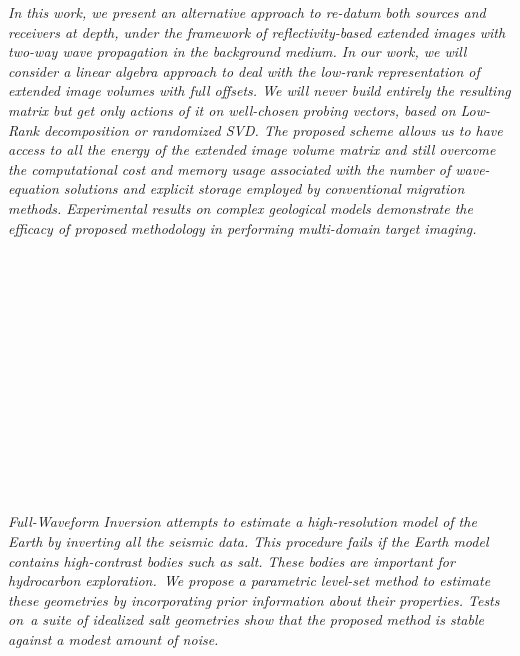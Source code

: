 \begin{multicols}{2}
      \textit{In this work, we present an alternative approach to re-datum both sources and receivers at depth, under the framework of reflectivity-based extended images with two-way wave propagation in the background medium. In our work, we will consider a linear algebra approach to deal with the low-rank representation of extended image volumes with full offsets. We will never build entirely the resulting matrix but get only actions of it on well-chosen probing vectors, based on Low-Rank decomposition or randomized SVD. The proposed scheme  allows us to have access to all the energy of the extended image volume matrix and still overcome the computational cost and memory usage associated with the number of wave-equation solutions and explicit storage employed by conventional migration methods. Experimental results on complex geological models demonstrate the efficacy of proposed methodology in performing multi-domain target imaging.}\\
\\ 
        \\
        \\\\
        \\
        \\\\
        \\
        \\\\
        \\
        \\\\
\\
      \textit{Full-Waveform Inversion attempts to estimate a high-resolution model of the Earth by inverting all the seismic data. This procedure fails if the Earth model contains high-contrast bodies such as salt. These bodies are important for hydrocarbon exploration. We propose a parametric level-set method to estimate these geometries by incorporating prior information about their properties. Tests on a suite of idealized salt geometries show that the proposed method is stable against a modest amount of noise.}\\
\\ 
        \\
        \\\\

\end{multicols}
